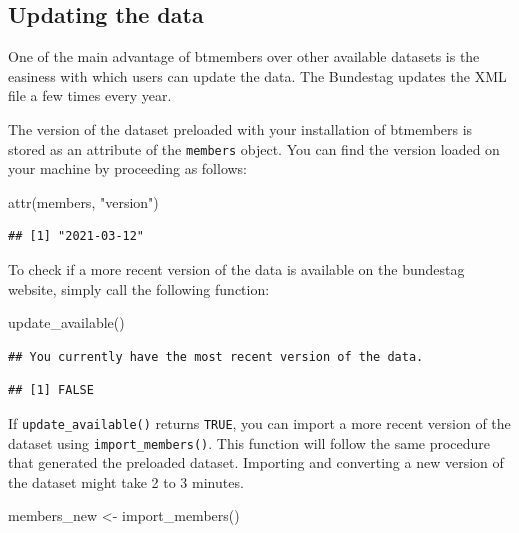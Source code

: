 \documentclass[12pt]{article}
\newenvironment{Shaded}{\begin{snugshade}}{\end{snugshade}}
\newcommand{\FunctionTok}[1]{\textcolor[rgb]{0.00,0.00,0.00}{#1}}
\newcommand{\NormalTok}[1]{#1}
\newcommand{\OtherTok}[1]{\textcolor[rgb]{0.56,0.35,0.01}{#1}}
\newcommand{\StringTok}[1]{\textcolor[rgb]{0.31,0.60,0.02}{#1}}
\begin{document}
\hypertarget{updating-the-data}{%
\subsection{Updating the data}\label{updating-the-data}}

One of the main advantage of btmembers over other available datasets is
the easiness with which users can update the data. The Bundestag updates
the XML file a few times every year.

The version of the dataset preloaded with your installation of btmembers
is stored as an attribute of the \texttt{members} object. You can find
the version loaded on your machine by proceeding as follows:

\begin{Shaded}
\begin{Highlighting}[]
\FunctionTok{attr}\NormalTok{(members, }\StringTok{"version"}\NormalTok{)}
\end{Highlighting}
\end{Shaded}

\begin{verbatim}
## [1] "2021-03-12"
\end{verbatim}

To check if a more recent version of the data is available on the
bundestag website, simply call the following function:

\begin{Shaded}
\begin{Highlighting}[]
\FunctionTok{update\_available}\NormalTok{()}
\end{Highlighting}
\end{Shaded}

\begin{verbatim}
## You currently have the most recent version of the data.
\end{verbatim}

\begin{verbatim}
## [1] FALSE
\end{verbatim}

If \texttt{update\_available()} returns \texttt{TRUE}, you can import a
more recent version of the dataset using \texttt{import\_members()}.
This function will follow the same procedure that generated the
preloaded dataset. Importing and converting a new version of the dataset
might take 2 to 3 minutes.

\begin{Shaded}
\begin{Highlighting}[]
\NormalTok{members\_new }\OtherTok{\textless{}{-}} \FunctionTok{import\_members}\NormalTok{()}
\end{Highlighting}
\end{Shaded}
\end{document}
